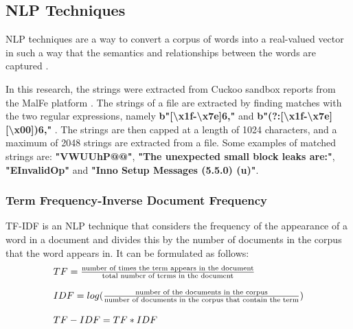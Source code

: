 \documentclass[conference]{IEEEtran}
\begin{document}
\subsection{NLP Techniques}
NLP techniques are a way to convert a corpus of words into a real-valued vector in such a way that the semantics and relationships between the words are captured \cite{turing-nlp}. \par
In this research, the strings were extracted from Cuckoo sandbox reports from the MalFe platform \cite{malfe}. The strings of a file are extracted by finding matches with the two regular expressions, namely \textbf{b"[\textbackslash x1f-\textbackslash x7e]{6,}"} and \textbf{b"(?:[\textbackslash x1f-\textbackslash x7e][\textbackslash x00]){6,}"} \cite{cuckoo-strings}. The strings are then capped at a length of 1024 characters, and a maximum of 2048 strings are extracted from a file. Some examples of matched strings are: \textbf{"VWUUhP@@"}, \textbf{"The unexpected small block leaks are:"}, \textbf{"EInvalidOp"} and \textbf{"Inno Setup Messages (5.5.0) (u)"}. \\

\subsubsection{Term Frequency-Inverse Document Frequency}
TF-IDF is an NLP technique that considers the frequency of the appearance of a word in a document and divides this by the number of documents in the corpus that the word appears in. It can be formulated as follows:
\begin{equation*}
\begin{array}{l}
TF = \frac{\textnormal{number of times the term appears in the document}}{\textnormal{total number of terms in the document}} \\\\
IDF = log(\frac{\textnormal{number of the documents in the corpus}}{\textnormal{number of documents in the corpus that contain the term}}) \\\\
TF-IDF = TF*IDF
\end{array}
\end{equation*}
\end{document}
